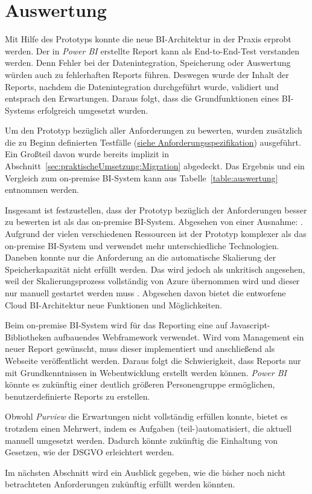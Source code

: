 \section{Auswertung} \label{sec:umsetzung:auswertung}
Mit Hilfe des Prototyps konnte die neue BI-Architektur in der Praxis erprobt werden. Der in \textit{Power BI} erstellte Report kann als End-to-End-Test verstanden werden. Denn Fehler bei der Datenintegration, Speicherung oder Auswertung würden auch zu fehlerhaften Reports führen. Deswegen wurde der Inhalt der Reports, nachdem die Datenintegration durchgeführt wurde, validiert und entsprach den Erwartungen. Daraus folgt, dass die Grundfunktionen eines BI-Systems erfolgreich umgesetzt wurden.

Um den Prototyp bezüglich aller Anforderungen zu bewerten, wurden zusätzlich die zu Beginn definierten Testfälle (\hyperref[sec:anforderungsspezifikation:funktionaleAnforderungen]{siehe Anforderungsspezifikation}) ausgeführt. Ein Großteil davon wurde bereits implizit in Abschnitt~\ref{sec:praktischeUmsetzung:Migration} abgedeckt. Das Ergebnis und ein Vergleich zum on-premise BI-System kann aus Tabelle~\ref{table:auswertung} entnommen werden. 



\hfill \break
\noindent Insgesamt ist festzustellen, dass der Prototyp bezüglich der Anforderungen besser zu bewerten ist als das on-premise BI-System. Abgesehen von einer Ausnahme: \textit{}. Aufgrund der vielen verschiedenen Ressourcen ist der Prototyp komplexer als das on-premise BI-System und verwendet mehr unterschiedliche Technologien. Daneben konnte nur die Anforderung an die automatische Skalierung der Speicherkapazität nicht erfüllt werden. Das wird jedoch als unkritisch angesehen, weil der Skalierungsprozess vollständig von Azure übernommen wird und dieser nur manuell gestartet werden muss \cite{reagan_web_2018}. Abgesehen davon bietet die entworfene Cloud BI-Architektur neue Funktionen und Möglichkeiten. 

Beim on-premise BI-System wird für das Reporting eine auf Javascript-Bibliotheken aufbauendes Webframework verwendet. Wird vom Management ein neuer Report gewünscht, muss dieser implementiert und anschließend als Webseite veröffentlicht werden. Daraus folgt die Schwierigkeit, dass Reports nur mit Grundkenntnissen in Webentwicklung erstellt werden können. \textit{Power BI} könnte es zukünftig einer deutlich größeren Personengruppe ermöglichen, benutzerdefinierte Reports zu erstellen.

Obwohl \textit{Purview} die Erwartungen nicht vollständig erfüllen konnte, bietet es trotzdem einen Mehrwert, indem es Aufgaben (teil-)automatisiert, die aktuell manuell umgesetzt werden. Dadurch könnte zukünftig die Einhaltung von Gesetzen, wie der DSGVO erleichtert werden.

Im nächsten Abschnitt wird ein Ausblick gegeben, wie die bisher noch nicht betrachteten Anforderungen zukünftig erfüllt werden könnten.